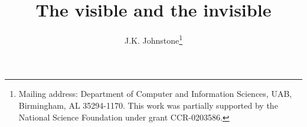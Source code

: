 \documentclass[12pt]{article}
\title{The visible and the invisible} %
\author{J.K. Johnstone\thanks{Mailing address: Department of Computer and 
    Information Sciences, UAB, Birmingham, AL 35294-1170.  This work
    was partially supported by the National Science Foundation under grant CCR-0203586.}}
\newif\ifCommentary             %
\newif\ifTalk                   %
\begin{document}
\maketitle

\vspace{.5in}

\ifTalk

\begin{quote}
For by him were all things created, that are in heaven, and that are in earth, 
visible and invisible (Colossians 1:16)
\end{quote}

\begin{quote}
The lamp of the body is the eye.  (Matthew 6:22)
\end{quote}

\begin{quote}
\ldots but everything exposed by the light becomes visible \ldots (Ephesians 5, 13)
\end{quote}

\begin{quote}
\ldots I have heard\\
The cock, that is the trumpet to the morn, \\
Doth with his lofty and shrill-sounding throat\\
Awake the god of day (Hamlet, I.I.154-157)
\end{quote}

\begin{quote}
Over the land there lies a long shadow\\
westward reaching wings of darkness\\
(The Return of the King, J.R.R. Tolkien, p. 812, the words of Malbeth the Seer)
\end{quote}

\begin{quote}
Harry Potter's invisibility cloak.
\end{quote}

\begin{quote}
Perseus and the Nymph's helmet of invisibility in the Medusa tale.
\end{quote}
\fi

\ifCommentary
A technical report on the umbra cast by a single object (the visibility of an object 
in a scene of two objects), both back and front; with accompanying software.
\fi

\clearpage

\end{document}
